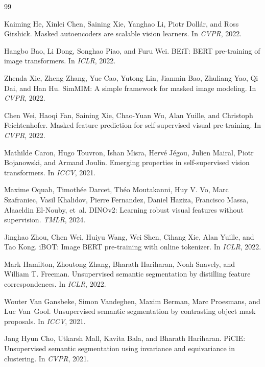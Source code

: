 \documentclass{article}
\begin{document}
\begin{thebibliography}{99}

Kaiming He, Xinlei Chen, Saining Xie, Yanghao Li, Piotr Doll{\'a}r, and
Ross Girshick.
\newblock Masked autoencoders are scalable vision learners.
\newblock In \emph{CVPR}, 2022.

Hangbo Bao, Li Dong, Songhao Piao, and Furu Wei.
\newblock BEiT: BERT pre-training of image transformers.
\newblock In \emph{ICLR}, 2022.

Zhenda Xie, Zheng Zhang, Yue Cao, Yutong Lin, Jianmin Bao, Zhuliang Yao,
Qi Dai, and Han Hu.
\newblock SimMIM: A simple framework for masked image modeling.
\newblock In \emph{CVPR}, 2022.

Chen Wei, Haoqi Fan, Saining Xie, Chao-Yuan Wu, Alan Yuille, and Christoph
Feichtenhofer.
\newblock Masked feature prediction for self-supervised visual pre-training.
\newblock In \emph{CVPR}, 2022.

Mathilde Caron, Hugo Touvron, Ishan Misra, Herv{\'e} J{\'e}gou, Julien Mairal,
Piotr Bojanowski, and Armand Joulin.
\newblock Emerging properties in self-supervised vision transformers.
\newblock In \emph{ICCV}, 2021.

Maxime Oquab, Timoth{\'e}e Darcet, Th{\'e}o Moutakanni, Huy V. Vo,
Marc Szafraniec, Vasil Khalidov, Pierre Fernandez, Daniel Haziza, Francisco
Massa, Alaaeldin El-Nouby, et~al.
\newblock DINOv2: Learning robust visual features without supervision.
\newblock \emph{TMLR}, 2024.

Jinghao Zhou, Chen Wei, Huiyu Wang, Wei Shen, Cihang Xie, Alan Yuille, and
Tao Kong.
\newblock iBOT: Image BERT pre-training with online tokenizer.
\newblock In \emph{ICLR}, 2022.

Mark Hamilton, Zhoutong Zhang, Bharath Hariharan, Noah Snavely, and
William T. Freeman.
\newblock Unsupervised semantic segmentation by distilling feature correspondences.
\newblock In \emph{ICLR}, 2022.

Wouter Van Gansbeke, Simon Vandeghen, Maxim Berman, Marc Proesmans, and
Luc Van~Gool.
\newblock Unsupervised semantic segmentation by contrasting object mask proposals.
\newblock In \emph{ICCV}, 2021.

Jang Hyun Cho, Utkarsh Mall, Kavita Bala, and Bharath Hariharan.
\newblock PiCIE: Unsupervised semantic segmentation using invariance and
equivariance in clustering.
\newblock In \emph{CVPR}, 2021.


\end{thebibliography}
\end{document}
